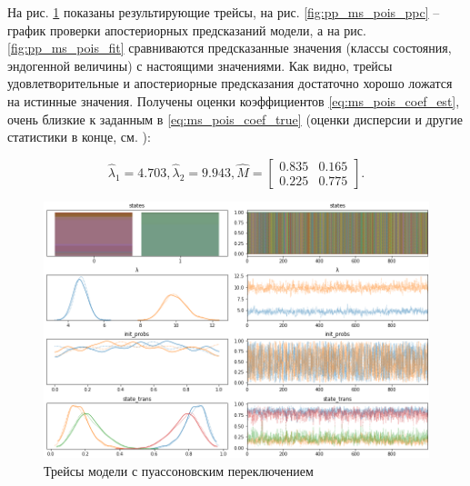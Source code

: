 \documentclass[a4paper,14pt]{extreport}
\begin{document}
На рис. \ref{fig:pp_ms_pois_trace} показаны результирующие трейсы, на рис.  \ref{fig:pp_ms_pois_ppc} -- график проверки апостериорных предсказаний модели, а на рис. \ref{fig:pp_ms_pois_fit} сравниваются предсказанные значения (классы состояния, эндогенной величины) с настоящими значениями. Как видно, трейсы удовлетворительные и апостериорные предсказания достаточно хорошо ложатся на истинные значения. Получены оценки коэффициентов \eqref{eq:ms_pois_coef_est}, очень близкие к заданным в \eqref{eq:ms_pois_coef_true} (оценки дисперсии и другие статистики в конце, см. ):

\begin{equation}
	\hat{\lambda}_1 = 4.703, 
	\hat{\lambda}_2 = 9.943,
	\hat{M}= \left[ {\begin{array}{cc}
					0.835 & 0.165 \\
					0.225 & 0.775
				\end{array} } \right]
	.
	\label{eq:ms_pois_coef_est}
\end{equation}

\begin{figure}[H]
	\includegraphics[width=\linewidth]{img/gen/pp_ms_pois_trace.png}
	\caption{Трейсы модели с пуассоновским переключением}
	\label{fig:pp_ms_pois_trace}
\end{figure}
\end{document}
